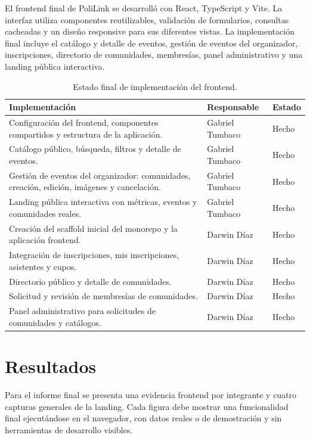 \documentclass[12pt]{article}
\renewcommand{\arraystretch}{1.25}
\begin{document}
El frontend final de PoliLink se desarrolló con React, TypeScript y Vite. La
interfaz utiliza componentes reutilizables, validación de formularios,
consultas cacheadas y un diseño responsive para sus diferentes vistas. La
implementación final incluye el catálogo y detalle de eventos, gestión de
eventos del organizador, inscripciones, directorio de comunidades, membresías,
panel administrativo y una landing pública interactiva.

\begin{table}[htbp]
\centering
\footnotesize
\renewcommand{\arraystretch}{1.15}
\begin{tabularx}{\textwidth}{|Y|>{\centering\arraybackslash}p{2.8cm}|>{\centering\arraybackslash}p{1.8cm}|}
\hline
\textbf{Implementación} & \textbf{Responsable} & \textbf{Estado} \\
\hline
Configuración del frontend, componentes compartidos y estructura de la aplicación. & Gabriel Tumbaco & Hecho \\
\hline
Catálogo público, búsqueda, filtros y detalle de eventos. & Gabriel Tumbaco & Hecho \\
\hline
Gestión de eventos del organizador: comunidades, creación, edición, imágenes y cancelación. & Gabriel Tumbaco & Hecho \\
\hline
Landing pública interactiva con métricas, eventos y comunidades reales. & Gabriel Tumbaco & Hecho \\
\hline
Creación del scaffold inicial del monorepo y la aplicación frontend. & Darwin Díaz & Hecho \\
\hline
Integración de inscripciones, mis inscripciones, asistentes y cupos. & Darwin Díaz & Hecho \\
\hline
Directorio público y detalle de comunidades. & Darwin Díaz & Hecho \\
\hline
Solicitud y revisión de membresías de comunidades. & Darwin Díaz & Hecho \\
\hline
Panel administrativo para solicitudes de comunidades y catálogos. & Darwin Díaz & Hecho \\
\hline
\end{tabularx}
\caption{Estado final de implementación del frontend.}
\end{table}

\section{Resultados}

Para el informe final se presenta una evidencia frontend por integrante y
cuatro capturas generales de la landing. Cada figura debe mostrar una
funcionalidad final ejecutándose en el navegador, con datos reales o de
demostración y sin herramientas de desarrollo visibles.
\end{document}
